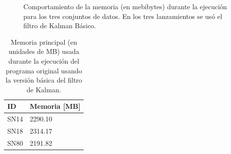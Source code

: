 \begin{figure}[h!]
\centering
{}\hfill
{}\vfill
{}
\caption{Comportamiento de la memoria (en mebibytes) durante la ejecuci\'on para los tres conjuntos de datos. En los tres lanzamientos se us\'o el filtro de Kalman B\'asico.}
\label{fig:mem_kbf}
\end{figure}

\begin{table}
\centering
\begin{tabular}{|l|l|}
\hline
\textbf{ID} & Memoria [MB]\\\hline\hline
SN14 & 2290.10\\\hline
SN18 & 2314.17\\\hline
SN80 & 2191.82\\\hline
\end{tabular}
\caption{Memoria principal (en unidades de MB) usada durante la ejecuci\'on del programa original usando la versi\'on b\'asica del filtro de Kalman.}
\label{tab:mem1}
\end{table}

